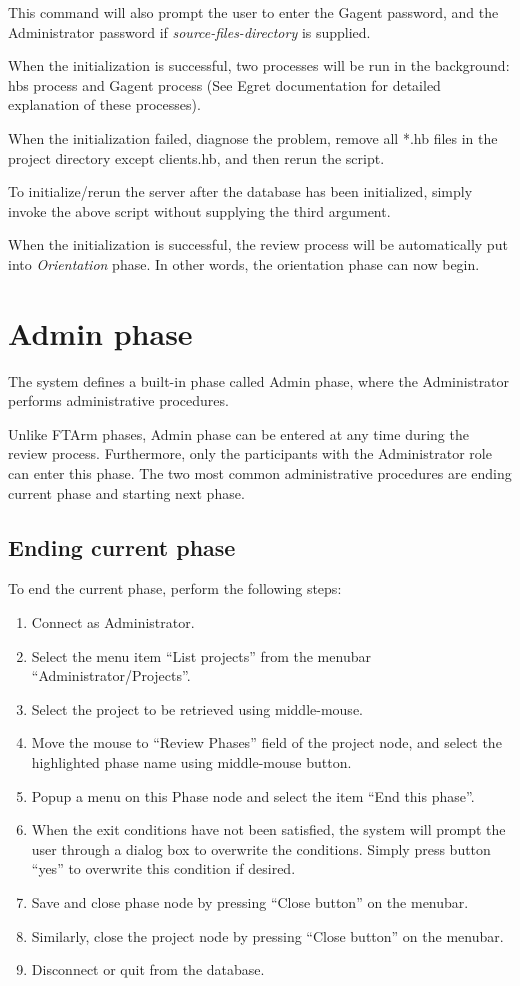 \begin{enumerate}
This command will also prompt the user to enter the Gagent password,
and the Administrator password if {\it source-files-directory} is
supplied.  

When the initialization is successful, two processes will be run in the 
background: hbs process and Gagent process (See Egret
documentation for detailed explanation of these processes).

When the initialization failed, diagnose the problem, remove all
*.hb files in the project directory except clients.hb, and then rerun
the script.

To initialize/rerun the server after the database has been
initialized, simply invoke the above script without supplying the
third argument.

\end{enumerate}

When the initialization is successful, the review process will be
automatically put into {\it Orientation} phase. In other words, the
orientation phase can now begin.

\section{Admin phase}
The system defines a built-in phase called Admin phase, where the
Administrator performs administrative procedures.

Unlike FTArm phases, Admin phase can be entered at any time during the
review process. Furthermore, only the participants with the
Administrator role can enter this phase.
The two most common administrative procedures are
ending current phase and starting next phase.

\subsection* {Ending current phase}
To end the current phase, perform the following steps:
\begin{enumerate}
\item Connect as Administrator.
\item Select the menu item ``List projects'' from the menubar
``Administrator/Projects''.
\item Select the project to be retrieved using middle-mouse.
\item Move the mouse to ``Review Phases'' field of the project node,
and select the highlighted phase name using middle-mouse button.
\item Popup a menu on this Phase node and select the item
``End this phase''. 
\item When the exit conditions have not been satisfied, the system will
prompt the user through a dialog box to overwrite the
conditions. Simply press button ``yes'' to overwrite this condition if
desired. 
\item Save and close phase node by pressing ``Close button'' on the
menubar. 
\item Similarly, close the project node by pressing  ``Close button''
on the menubar.
\item Disconnect or quit from the database.
\end{enumerate}

